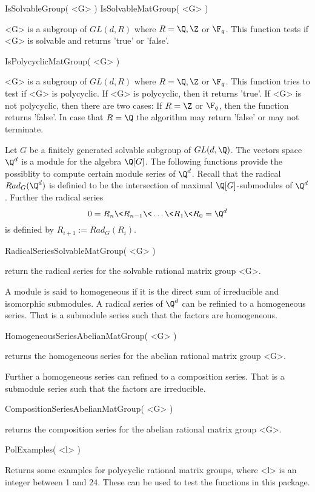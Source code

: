 \> IsSolvableGroup( <G> )
\> IsSolvableMatGroup( <G> )

<G> is  a subgroup of $GL(d,R)$ where $R=\Q,\Z $ or $\F_q$.
This function tests if <G> is
solvable and returns 'true' or 'false'. 

\> IsPolycyclicMatGroup( <G> )

<G> is  a subgroup of $GL(d,R)$ where $R=\Q,\Z $ or $\F_q$.
 This function tries to test if <G> is polycyclic. If <G> is polycyclic,
 then it returns 'true'. 
If <G> is not polycyclic, then there are two cases: If $R=\Z$ or $\F_q$,
then the function returns 'false'. In case that $R=\Q$ the algorithm may
return 'false' or may not terminate.
 

Let $G$ be a finitely generated solvable subgroup of $GL(d,\Q)$. The vectors
space $\Q^d$ is a module for the algebra $\Q[G]$. The following
functions provide the possiblity to compute certain module series of
$\Q^d$. Recall that the radical $Rad_G(\Q^d)$ is definied to be the
intersection of maximal $\Q[G]$-submodules of $\Q^d$. Further the
radical series 
$$
0=R_n \< R_{n-1} \< \dots \< R_1 \< R_0=\Q^d 
$$
is definied by $R_{i+1}:= Rad_G(R_i)$. 

\> RadicalSeriesSolvableMatGroup( <G> )

return the radical series for the solvable rational matrix group
<G>. 

A module is said to homogeneous if it is the direct sum of
irreducible and isomorphic submodules. 
A radical series of $\Q^d$ can be refinied to a homogeneous series. 
That is a submodule series such that the factors are homogeneous.

\> HomogeneousSeriesAbelianMatGroup( <G> )

returns the homogeneous series for the abelian rational matrix group <G>.

Further a homogeneous series can refined to a composition series. That is
a submodule series such that the factors are irreducible.

\> CompositionSeriesAbelianMatGroup( <G> )

returns the composition series for the abelian rational matrix group <G>.


\> PolExamples( <l> )
 
Returns some examples for polycyclic rational matrix groups, where <l> 
is an integer
between 1 and 24. 
These can be used to test the functions in this package. 














